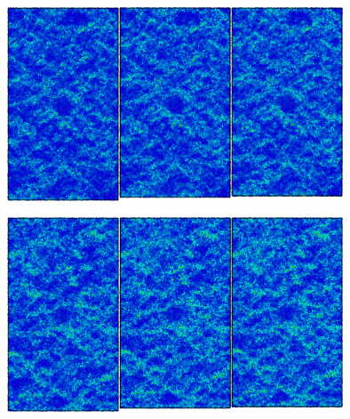 \begin{figure}[htp]
\centering
\includegraphics[width=10cm]{../ResumenImagenes/Figures/NanoParticles/Snapshots/B2SphereCompression_200K_Snapshots.png}
\caption[Inclusión de CuZr-B2 bajo compresión a 200K]{}
\label{C4:fg:snapshot_comp_B2_200K}
\end{figure}


\begin{figure}[htp]
\centering
\includegraphics[width=10cm]{../ResumenImagenes/Figures/NanoParticles/Snapshots/B2SphereCompression_400K_Snapshots.png}
\caption[Inclusión de CuZr-B2 bajo compresión a 400K]{}
\label{C4:fg:snapshot_comp_B2_400K}
\end{figure}

